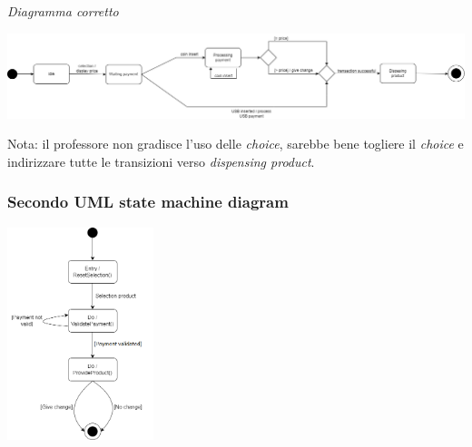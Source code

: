 \documentclass{article}
\begin{document}
\textit{Diagramma corretto}
\begin{center}
    \includegraphics[width=1\textwidth]{foto 7.png}
\end{center}
Nota: il professore non gradisce l'uso delle \textit{choice}, sarebbe bene togliere il \textit{choice} e indirizzare tutte le transizioni verso \textit{dispensing product}.
\subsubsection*{Secondo UML state machine diagram}
\large
\begin{center}
    \includegraphics[width=0.32\textwidth]{foto 8.png}    
\end{center}
\end{document}
